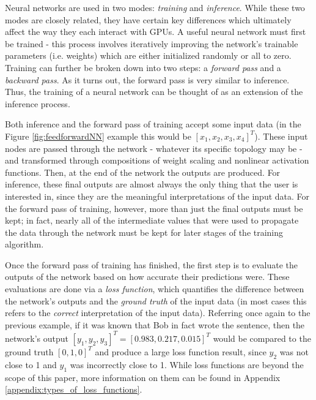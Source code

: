 \documentclass[12pt,letterpaper]{article}
\begin{document}
Neural networks are used in two modes: \textit{training} and \textit{inference}. While these two modes are closely related, they have certain key differences which ultimately affect the way they each interact with GPUs. A useful neural network must first be trained - this process involves iteratively improving the network's trainable parameters (i.e. weights) which are either initialized randomly or all to zero. Training can further be broken down into two steps: a \textit{forward pass} and a \textit{backward pass}. As it turns out, the forward pass is very similar to inference. Thus, the training of a neural network can be thought of as an extension of the inference process.
\par 

Both inference and the forward pass of training accept some input data (in the Figure \ref{fig:feedforwardNN} example this would be $[x_1,x_2,x_3,x_4]^T$). These input nodes are passed through the network - whatever its specific topology may be - and transformed through compositions of weight scaling and nonlinear activation functions. Then, at the end of the network the outputs are produced. For inference, these final outputs are almost always the only thing that the user is interested in, since they are the meaningful interpretations of the input data. For the forward pass of training, however, more than just the final outputs must be kept; in fact, nearly all of the intermediate values that were used to propagate the data through the network must be kept for later stages of the training algorithm.
\par

Once the forward pass of training has finished, the first step is to evaluate the outputs of the network based on how accurate their predictions were. These evaluations are done via a \textit{loss function}, which quantifies the difference between the network's outputs and the \textit{ground truth} of the input data (in most cases this refers to the \textit{correct} interpretation of the input data). Referring once again to the previous example, if it was known that Bob in fact wrote the sentence, then the network's output $[y_1,y_2,y_3]^T = [0.983,0.217,0.015]^T$ would be compared to the ground truth $[0,1,0]^T$ and produce a large loss function result, since $y_2$ was not close to 1 and $y_1$ was incorrectly close to 1. While loss functions are beyond the scope of this paper, more information on them can be found in Appendix \ref{appendix:types_of_loss_functions}.
\par
\end{document}
